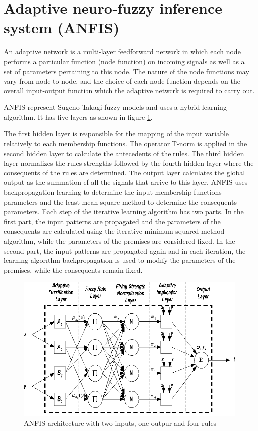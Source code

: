 
\section{Adaptive neuro‑fuzzy inference system (ANFIS)}
An adaptive network is a multi-layer feedforward network in which each node performs a particular
function (node function) on incoming signals as well as a set of parameters pertaining to this node. The nature
of the node functions may vary from node to node, and the choice of each node function depends on the overall
input-output function which the adaptive network is required to carry out.

ANFIS represent Sugeno-Takagi fuzzy models and uses a hybrid learning algorithm. It has five layers as
shown in figure \ref{img:archit}.

The first hidden layer is
responsible for the mapping of the input variable
relatively to each membership functions. The
operator T-norm is applied in the second hidden
layer to calculate the antecedents of the rules. The
third hidden layer normalizes the rules strengths
followed by the fourth hidden layer where the
consequents of the rules are determined. The output
layer calculates the global output as the summation
of all the signals that arrive to this layer.
ANFIS uses backpropagation learning to determine
the input membership functions parameters and the
least mean square method to determine the
consequents parameters. Each step of the iterative
learning algorithm has two parts. In the first part, the
input patterns are propagated and the parameters of
the consequents are calculated using the iterative
minimum squared method algorithm, while the
parameters of the premises are considered fixed. In
the second part, the input patterns are propagated
again and in each iteration, the learning algorithm
backpropagation is used to modify the parameters of
the premises, while the consequents remain fixed. \cite{inproceedings}

\begin{figure}[h]
    \centering
    \includegraphics[width=.9\textwidth]{problematics/figure2}
    \caption{ANFIS architecture with two inputs, one outpur and four rules}
    \label{img:archit}
\end{figure}